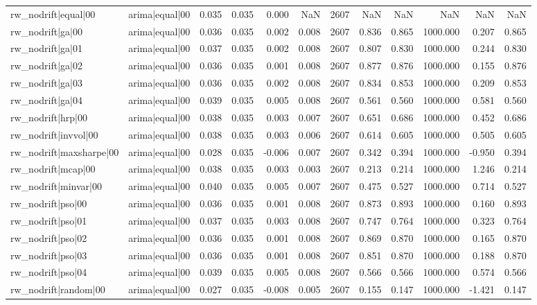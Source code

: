 \begin{table}
\begin{tabular}{llrrrrrrrrrr}
rw\_nodrift|equal|00 & arima|equal|00 & 0.035 & 0.035 & 0.000 & NaN & 2607 & NaN & NaN & NaN & NaN & NaN \\
rw\_nodrift|ga|00 & arima|equal|00 & 0.036 & 0.035 & 0.002 & 0.008 & 2607 & 0.836 & 0.865 & 1000.000 & 0.207 & 0.865 \\
rw\_nodrift|ga|01 & arima|equal|00 & 0.037 & 0.035 & 0.002 & 0.008 & 2607 & 0.807 & 0.830 & 1000.000 & 0.244 & 0.830 \\
rw\_nodrift|ga|02 & arima|equal|00 & 0.036 & 0.035 & 0.001 & 0.008 & 2607 & 0.877 & 0.876 & 1000.000 & 0.155 & 0.876 \\
rw\_nodrift|ga|03 & arima|equal|00 & 0.036 & 0.035 & 0.002 & 0.008 & 2607 & 0.834 & 0.853 & 1000.000 & 0.209 & 0.853 \\
rw\_nodrift|ga|04 & arima|equal|00 & 0.039 & 0.035 & 0.005 & 0.008 & 2607 & 0.561 & 0.560 & 1000.000 & 0.581 & 0.560 \\
rw\_nodrift|hrp|00 & arima|equal|00 & 0.038 & 0.035 & 0.003 & 0.007 & 2607 & 0.651 & 0.686 & 1000.000 & 0.452 & 0.686 \\
rw\_nodrift|invvol|00 & arima|equal|00 & 0.038 & 0.035 & 0.003 & 0.006 & 2607 & 0.614 & 0.605 & 1000.000 & 0.505 & 0.605 \\
rw\_nodrift|maxsharpe|00 & arima|equal|00 & 0.028 & 0.035 & -0.006 & 0.007 & 2607 & 0.342 & 0.394 & 1000.000 & -0.950 & 0.394 \\
rw\_nodrift|mcap|00 & arima|equal|00 & 0.038 & 0.035 & 0.003 & 0.003 & 2607 & 0.213 & 0.214 & 1000.000 & 1.246 & 0.214 \\
rw\_nodrift|minvar|00 & arima|equal|00 & 0.040 & 0.035 & 0.005 & 0.007 & 2607 & 0.475 & 0.527 & 1000.000 & 0.714 & 0.527 \\
rw\_nodrift|pso|00 & arima|equal|00 & 0.036 & 0.035 & 0.001 & 0.008 & 2607 & 0.873 & 0.893 & 1000.000 & 0.160 & 0.893 \\
rw\_nodrift|pso|01 & arima|equal|00 & 0.037 & 0.035 & 0.003 & 0.008 & 2607 & 0.747 & 0.764 & 1000.000 & 0.323 & 0.764 \\
rw\_nodrift|pso|02 & arima|equal|00 & 0.036 & 0.035 & 0.001 & 0.008 & 2607 & 0.869 & 0.870 & 1000.000 & 0.165 & 0.870 \\
rw\_nodrift|pso|03 & arima|equal|00 & 0.036 & 0.035 & 0.001 & 0.008 & 2607 & 0.851 & 0.870 & 1000.000 & 0.188 & 0.870 \\
rw\_nodrift|pso|04 & arima|equal|00 & 0.039 & 0.035 & 0.005 & 0.008 & 2607 & 0.566 & 0.566 & 1000.000 & 0.574 & 0.566 \\
rw\_nodrift|random|00 & arima|equal|00 & 0.027 & 0.035 & -0.008 & 0.005 & 2607 & 0.155 & 0.147 & 1000.000 & -1.421 & 0.147 \\

\end{tabular}
\end{table}
